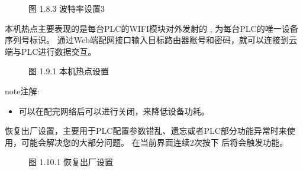\documentclass[a4paper,10pt,english]{sphinxmanual}
\begin{document}
\begin{figure}[htbp]
\centering
\capstart

\noindent{}
\caption{图 1.8.3 波特率设置3}\label{\detokenize{operation_guide:id22}}\end{figure}

\sphinxAtStartPar
{}

\sphinxAtStartPar
本机热点主要表现的是每台PLC的WIFI模块对外发射的 , 为每台PLC的唯一设备序列号标识。
通过Web端配网接口输入目标路由器账号和密码，就可以连接到云端与PLC进行数据交互。

\begin{figure}[htbp]
\centering
\capstart

\noindent{}
\caption{图 1.9.1 本机热点设置}\label{\detokenize{operation_guide:id23}}\end{figure}

\begin{sphinxadmonition}{note}{注解:}\begin{itemize}
\item {} 
\sphinxAtStartPar
{} 可以在配完网络后可以进行关闭，来降低设备功耗。

\end{itemize}
\end{sphinxadmonition}

\sphinxAtStartPar
{}

\sphinxAtStartPar
恢复出厂设置，主要用于PLC配置参数错乱、遗忘或者PLC部分功能异常时来使用，可能会解决您的大部分问题。
在当前界面连续2次按下  后将会触发功能。

\begin{figure}[htbp]
\centering
\capstart

\noindent{}
\caption{图 1.10.1 恢复出厂设置}\label{\detokenize{operation_guide:id24}}\end{figure}
\end{document}
